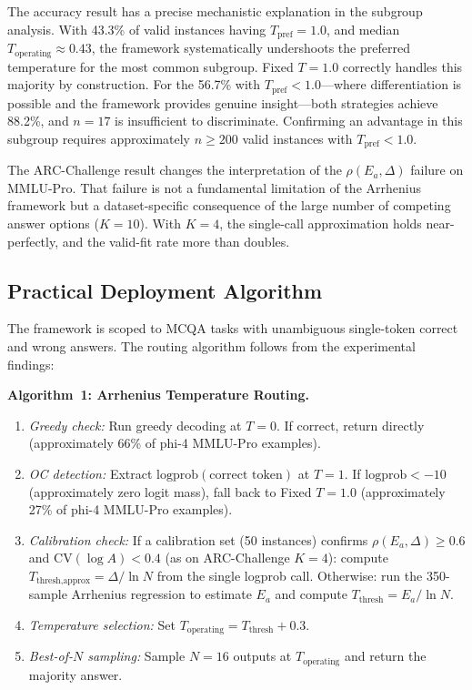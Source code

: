 \documentclass[11pt,letterpaper,twocolumn]{article}
\begin{document}
The accuracy result has a precise mechanistic explanation in the subgroup analysis. With
43.3\% of valid instances having $T_\text{pref} = 1.0$, and median $T_\text{operating}
\approx 0.43$, the framework systematically undershoots the preferred temperature for the
most common subgroup. Fixed $T=1.0$ correctly handles this majority by construction. For
the 56.7\% with $T_\text{pref} < 1.0$---where differentiation is possible and the
framework provides genuine insight---both strategies achieve 88.2\%, and $n=17$ is
insufficient to discriminate. Confirming an advantage in this subgroup requires
approximately $n \geq 200$ valid instances with $T_\text{pref} < 1.0$.

The ARC-Challenge result changes the interpretation of the $\rho(E_a, \Delta)$ failure
on MMLU-Pro. That failure is not a fundamental limitation of the Arrhenius framework but
a dataset-specific consequence of the large number of competing answer options ($K=10$).
With $K=4$, the single-call approximation holds near-perfectly, and the valid-fit rate
more than doubles.

\subsection{Practical Deployment Algorithm}

The framework is scoped to MCQA tasks with unambiguous single-token correct and wrong
answers. The routing algorithm follows from the experimental findings:

\textbf{Algorithm~1: Arrhenius Temperature Routing.}
\begin{enumerate}[leftmargin=*,topsep=2pt,itemsep=2pt]
  \item \emph{Greedy check:} Run greedy decoding at $T = 0$. If correct, return directly
  (approximately 66\% of phi-4 MMLU-Pro examples).
  \item \emph{OC detection:} Extract $\text{logprob}(\text{correct token})$ at $T=1$. If
  $\text{logprob} < -10$ (approximately zero logit mass), fall back to Fixed $T=1.0$
  (approximately 27\% of phi-4 MMLU-Pro examples).
  \item \emph{Calibration check:} If a calibration set (50 instances) confirms $\rho(E_a,
  \Delta) \geq 0.6$ and $\text{CV}(\log A) < 0.4$ (as on ARC-Challenge $K=4$): compute
  $T_\text{thresh,approx} = \Delta/\ln N$ from the single logprob call. Otherwise: run the
  350-sample Arrhenius regression to estimate $E_a$ and compute $T_\text{thresh} =
  E_a/\ln N$.
  \item \emph{Temperature selection:} Set $T_\text{operating} = T_\text{thresh} + 0.3$.
  \item \emph{Best-of-$N$ sampling:} Sample $N=16$ outputs at $T_\text{operating}$ and
  return the majority answer.
\end{enumerate}
\end{document}
